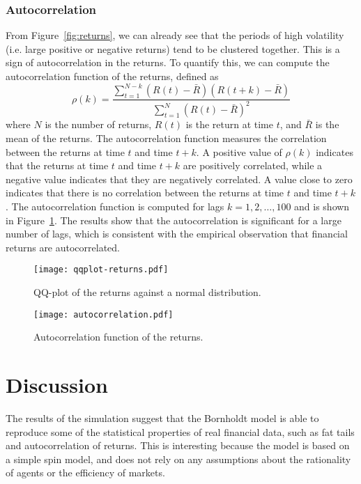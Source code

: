 \subsubsection{Autocorrelation}
From Figure~\ref{fig:returns}, we can already see that the periods of high volatility (i.e. large positive or negative returns) tend to be clustered together. This is a sign of autocorrelation in the returns. To quantify this, we can compute the autocorrelation function of the returns, defined as
\begin{equation}
    \rho(k) = \frac{\sum_{t=1}^{N-k} (R(t) - \bar{R})(R(t+k) - \bar{R})}{\sum_{t=1}^{N} (R(t) - \bar{R})^2}
\end{equation}
where $N$ is the number of returns, $R(t)$ is the return at time $t$, and $\bar{R}$ is the mean of the returns. The autocorrelation function measures the correlation between the returns at time $t$ and time $t+k$. A positive value of $\rho(k)$ indicates that the returns at time $t$ and time $t+k$ are positively correlated, while a negative value indicates that they are negatively correlated. A value close to zero indicates that there is no correlation between the returns at time $t$ and time $t+k$.
The autocorrelation function is computed for lags $k=1,2,\ldots,100$ and is shown in Figure~\ref{fig:autocorrelation}. The results show that the autocorrelation is significant for a large number of lags, which is consistent with the empirical observation that financial returns are autocorrelated.

\begin{figure}[H]
    \centering
    \begin{minipage}[T]{0.45\textwidth}
        \centering
        \texttt{[image: qqplot-returns.pdf]}
        \caption{QQ-plot of the returns against a normal distribution.}
        \label{fig:qqplot}
    \end{minipage}
    \hfill
    \begin{minipage}[T]{0.45\textwidth}
        \centering
        \texttt{[image: autocorrelation.pdf]}
        \caption{Autocorrelation function of the returns.}
        \label{fig:autocorrelation}
    \end{minipage}
\end{figure}


\section{Discussion}
The results of the simulation suggest that the Bornholdt model is able to reproduce some of the statistical properties of real financial data, such as fat tails and autocorrelation of returns. This is interesting because the model is based on a simple spin model, and does not rely on any assumptions about the rationality of agents or the efficiency of markets.

